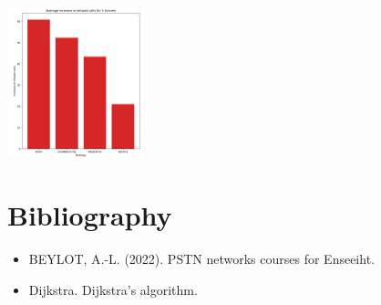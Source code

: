 \documentclass[lettersize,journal]{IEEEtran} %
\begin{document}
\begin{itemize}
\begin{itemize}
                \includegraphics[width=0.3\textwidth]{images/same_capacities_2.png}
        \end{itemize}
\end{itemize}

\newpage
\section{Bibliography}
\begin{itemize}
        \item BEYLOT, A.-L. (2022). PSTN networks courses for Enseeiht.
        \item Dijkstra. Dijkstra's algorithm.
\end{itemize}
\end{document}
